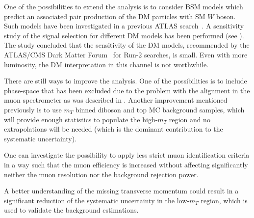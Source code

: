 One of the possibilities to extend the analysis is to consider BSM models which predict an associated pair production of the DM particles with SM $W$ boson. Such models have been investigated in a previous ATLAS search~\cite{wprime_8TeV}.
A sensitivity study of the signal selection for different DM models has been performed (see ).
The study concluded that the sensitivity of the DM models, recommended by the ATLAS/CMS Dark Matter Forum~\cite{DM_forum_2015} for Run-2 searches, is small.
Even with more luminosity, the DM interpretation in this channel is not worthwhile.


There are still ways to improve the analysis.
One of the possibilities is to include phase-space that has been excluded due
to the problem with the alignment in the muon spectrometer as was described in .
Another improvement mentioned previously is to use $m_T$ binned diboson and top MC background samples, which will provide enough statistics to populate the high-$m_T$ region and no extrapolations will be needed (which is the dominant contribution to the systematic uncertainty).

One can investigate the possibility to apply less strict muon identification criteria in a way such that the muon efficiency is increased without affecting significantly neither the muon resolution nor the background rejection power.


A better understanding of the missing transverse momentum could result in a significant reduction of the systematic uncertainty in the low-$m_T$ region, which is used to validate the background estimations.




